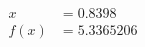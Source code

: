 \documentclass[preview]{standalone}
\begin{document}
\begin{align*}
x &= 0.8398\\f(x) &= 5.3365206
\end{align*}
\end{document}
